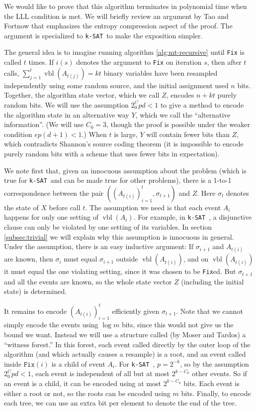 \documentclass[twocolumn]{article}
\newcommand{\ksat}{\texttt{k-SAT}~}
\begin{document}
We would like to prove that this algorithm terminates in polynomial time when the LLL condition is met.  We will briefly review an argument by Tao \cite{tao2009entropy} and Fortnow \cite{fortnow2009entropy} that emphasizes the entropy compression aspect of the proof.  The argument is specialized to \ksat to make the exposition simpler.

The general idea is to imagine running algorithm \ref{alg:mt-recursive} until \texttt{Fix} is called $t$ times.  If $i(s)$ denotes the argument to \texttt{Fix} on iteration $s$, then after $t$ calls, $\sum_{j = 1}^{t} \operatorname{vbl}(A_{t(j)}) = k t$ binary variables have been resampled independently using some random source, and the initial assignment used $n$ bits.  Together, the algorithm state vector, which we call $Z$, encodes $n + k t$ purely random bits.  We will use the assumption $2^C_0 p d < 1$ to give a method to encode the algorithm state in an alternative way $Y$, which we call the ``alternative information''.  (We will use $C_0 = 3$, though the proof is possible under the weaker condition $e p (d + 1) < 1$.)  When $t$ is large, $Y$ will contain fewer bits than $Z$, which contradicts Shannon's source coding theorem \cite{shannon2001mathematical} (it is impossible to encode purely random bits with a scheme that uses fewer bits in expectation).

We note first that, given an innocuous assumption about the problem (which is true for \ksat and can be made true for other problems), there is a 1-to-1 correspondence between the pair $((A_{t(i)})_{i=1}^{t}, \sigma_{t+1})$ and $Z$.  Here $\sigma_t$ denotes the state of $X$ before call $t$.  The assumption we need is that each event $A_i$ happens for only one setting of $\operatorname{vbl}(A_i)$.  For example, in \ksat, a disjunctive clause can only be violated by one setting of its variables.  In section \ref{subsec:trivial} we will explain why this assumption is innocuous in general.  Under the assumption, there is an easy inductive argument: If $\sigma_{i+1}$ and $A_{t(i)}$ are known, then $\sigma_i$ must equal $\sigma_{i+1}$ outside $\operatorname{vbl}(A_{t(i)})$, and on $\operatorname{vbl}(A_{t(i)})$ it must equal the one violating setting, since it was chosen to be \texttt{Fix}ed.  But $\sigma_{t+1}$ and all the events are known, so the whole state vector $Z$ (including the initial state) is determined.

It remains to encode $(A_{t(i)})_{i=1}^{t}$ efficiently given $\sigma_{t+1}$.  Note that we cannot simply encode the events using $\log m$ bits, since this would not give us the bound we want.  Instead we will use a structure called (by Moser and Tardos) a ``witness forest.''  In this forest, each event called directly by the outer loop of the algorithm (and which actually causes a resample) is a root, and an event called inside $\texttt{Fix}(i)$ is a child of event $A_i$.  For \ksat, $p = 2^{-k}$, so by the assumption $2^C_0 p d < 1$, each event is independent of all but at most $2^{k-C_0}$ other events.  So if an event is a child, it can be encoded using at most $2^{k-C_0}$ bits.  Each event is either a root or not, so the roots can be encoded using $m$ bits.  Finally, to encode each tree, we can use an extra bit per element to denote the end of the tree.
\end{document}
